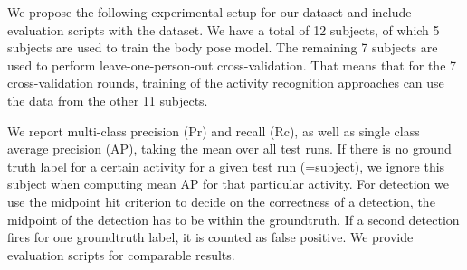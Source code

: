 We propose the following experimental setup for our dataset and include evaluation scripts with the dataset. 
%
We have a total of 12 subjects, of which 5 subjects are used to train the body pose model. 
The remaining 7 subjects are used to perform leave-one-person-out cross-validation.
That means that for the 7 cross-validation rounds, training of the activity recognition approaches 
can use the data from the other 11 subjects. 

We report multi-class precision (Pr) and recall (Rc), as well as single class average precision (AP), taking the mean over all test runs.
If there is no ground truth label for a certain activity for a given test run (=subject), we ignore this subject when computing mean AP for that particular activity.
For detection we use the midpoint hit criterion to decide on the correctness of a detection, \ie the midpoint of the detection has to be within the groundtruth. If a second detection fires for one groundtruth label, it is counted as 
false positive. We provide evaluation scripts for comparable results.